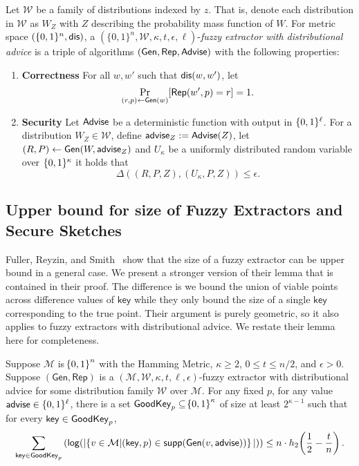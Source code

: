 \begin{definition}
\label{def:fe distributional}
Let $\mathcal{W}$ be a family of distributions indexed by $z$.  That is, denote each distribution in $\mathcal{W}$ as $W_Z$ with $Z$ describing the probability mass function of $W$.  
For metric space $(\{0,1\}^n, \mathsf{dis})$, a $(\{0,1\}^n, \mathcal{W}, \kappa, t, \epsilon, \ell)$-\emph{fuzzy extractor with distributional advice} is a triple of algorithms $({\mathsf{Gen}}, {\mathsf{Rep}}, {\mathsf{Advise}})$ with the following properties:
\begin{enumerate} 
\itemsep0em
\item \textbf{Correctness} For all $w, w'$ such that $\mathsf{dis}(w, w')$, let \[\Pr_{(r, p) \leftarrow {\ensuremath{\mathsf{Gen}}}(w)}[{\mathsf{Rep}}(w', p) = r]=1.\]
\item \textbf{Security} Let ${\mathsf{Advise}}$ be a deterministic function with output in $\{0, 1\}^\ell$.  For a distribution $W_Z \in \mathcal{W}$, define ${\mathsf{advise}}_Z:= {\mathsf{Advise}}(Z)$, let $(R, P) \leftarrow {\ensuremath{\mathsf{Gen}}}(W, {\mathsf{advise}}_Z)$ and $U_\kappa$ be a uniformly distributed random variable over $\{0, 1\}^\kappa$ it holds that \[\Delta((R, P, Z), (U_\kappa, P, Z))\le \epsilon.\]
\end{enumerate}
\end{definition}


\subsection{Upper bound for size of Fuzzy Extractors and Secure Sketches}
Fuller, Reyzin, and Smith~\cite{fuller2016fuzzy,fuller2020fuzzy} show that the size of a fuzzy extractor can be upper bound in a general case.  We present a stronger version of their lemma that is contained in their proof.  The difference is we bound the union of viable points across difference values of $\mathsf{key}$ while they only bound the size of a single $\mathsf{key}$ corresponding to the true point.  Their argument is purely geometric, so it also applies to fuzzy extractors with distributional advice. 
We restate their lemma here for completeness. 

\begin{lemma}
    \label{lem:smallgeneralviable}
    Suppose $\mathcal{M}$ is $\!\left\{ 0,1 \right\}^{n}$ with the Hamming Metric, $\kappa \geq 2$, $0 \leq t \leq n/2$, and $\epsilon > 0$. 
    Suppose $(\mathsf{Gen, Rep})$ is a $(\mathcal{M,W},\kappa, t, \ell, \epsilon)$-fuzzy extractor with distributional advice for some distribution family $\mathcal{W}$ over $\mathcal{M}$. 
    For any fixed $p$, for any value ${\mathsf{advise}} \in \{0, 1\}^\ell$, there is a set $\mathsf{GoodKey}_p \subseteq \!\left\{ 0,1 \right\}^{\kappa}$ of size at least $2^{\kappa - 1}$ such that for every $\mathsf{key} \in \mathsf{GoodKey}_p$,
    \[
       \sum_{\mathsf{key} \in \mathsf{GoodKey}_p} \left( \mathsf{log}\!\left(|\!\left\{ v \in \mathcal{M}|\!\left(\mathsf{key}, p\right) \in \mathsf{supp}\!\left(\mathsf{Gen}(v, {\mathsf{advise}})\right) \right\}|\right)\right) \leq n \cdot h_2\!\left(\frac{1}{2} - \frac{t}{n}\right).
    \]   
\end{lemma}

